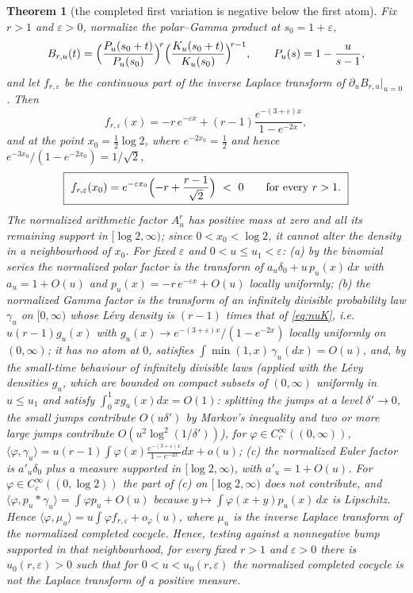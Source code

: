 \documentclass[11pt]{amsart}
\newtheorem{theorem}{Theorem}[section]
\theoremstyle{definition}
\theoremstyle{remark}
\theoremstyle{definition}
\newcommand{\eps}{\varepsilon}
\begin{document}
\begin{theorem}[the completed first variation is negative below the first atom]
\label{thm:halflog2}
Fix $r>1$ and $\eps>0$, normalize the polar--Gamma product at $s_0=1+\eps$,
\[
   B_{r,u}(t)=\Bigl(\frac{P_u(s_0+t)}{P_u(s_0)}\Bigr)^{\!r}
              \Bigl(\frac{K_u(s_0+t)}{K_u(s_0)}\Bigr)^{\!r-1},
   \qquad P_u(s)=1-\frac{u}{s-1},
\]
and let $f_{r,\eps}$ be the continuous part of the inverse Laplace transform of
$\partial_uB_{r,u}\big|_{u=0}$. Then
\begin{equation}\label{eq:frq}
   f_{r,\eps}(x)=-r\,e^{-\eps x}+(r-1)\frac{e^{-(3+\eps)x}}{1-e^{-2x}},
\end{equation}
and at the point $x_0=\tfrac12\log2$, where $e^{-2x_0}=\tfrac12$ and hence
$e^{-3x_0}/(1-e^{-2x_0})=1/\sqrt2$,
\begin{equation}\label{eq:frq-neg}
   \boxed{\ f_{r,\eps}(x_0)=e^{-\eps x_0}\Bigl(-r+\frac{r-1}{\sqrt2}\Bigr)\ <\ 0
   \qquad\text{for every }r>1.\ }
\end{equation}
The normalized arithmetic factor $A_u^r$ has positive mass at zero and all its remaining support in
$[\log2,\infty)$; since $0<x_0<\log2$, it cannot alter the density in a neighbourhood of $x_0$.
For fixed $\eps$ and $0<u\le u_1<\eps$: (a) by the binomial series the normalized polar factor is
the transform of $a_u\delta_0+u\,p_u(x)\,dx$ with $a_u=1+O(u)$ and $p_u(x)=-r\,e^{-\eps x}+O(u)$
locally uniformly; (b) the normalized Gamma factor is the transform of an infinitely divisible
probability law $\gamma_u$ on $[0,\infty)$ whose L\'evy density is $(r-1)$ times that of
\eqref{eq:nuK}, i.e.\ $u(r-1)g_u(x)$ with $g_u(x)\to e^{-(3+\eps)x}/(1-e^{-2x})$ locally
uniformly on $(0,\infty)$; it has no atom at $0$, satisfies $\int\min(1,x)\,\gamma_u(dx)=O(u)$,
and, by the small-time behaviour of infinitely divisible laws \cite{Sato} (applied with the L\'evy densities $g_u$, which are bounded on compact subsets of $(0,\infty)$ uniformly in $u\le u_1$ and satisfy $\int_0^1xg_u(x)dx=O(1)$: splitting the jumps at a level $\delta'\to0$, the small jumps contribute $O(u\delta')$ by Markov's inequality and two or more large jumps contribute $O(u^2\log^2(1/\delta'))$), for
$\varphi\in C_c^\infty((0,\infty))$,
$\langle\varphi,\gamma_u\rangle=u(r-1)\int\varphi(x)\frac{e^{-(3+\eps)x}}{1-e^{-2x}}dx+o(u)$;
(c) the normalized Euler factor is $a'_u\delta_0$ plus a measure supported in $[\log2,\infty)$,
with $a'_u=1+O(u)$. For $\varphi\in C_c^\infty((0,\log2))$ the part of (c) on $[\log2,\infty)$
does not contribute, and $\langle\varphi,p_u*\gamma_u\rangle=\int\varphi p_u+O(u)$ because
$y\mapsto\int\varphi(x+y)p_u(x)\,dx$ is Lipschitz. Hence
$\langle\varphi,\mu_u\rangle=u\int\varphi f_{r,\eps}+o_\varphi(u)$, where $\mu_u$ is the inverse
Laplace transform of the normalized completed cocycle.
Hence, testing against a nonnegative bump supported in that neighbourhood, for every fixed $r>1$
and $\eps>0$ there is $u_0(r,\eps)>0$ such that for $0<u<u_0(r,\eps)$ the normalized completed
cocycle is not the Laplace transform of a positive measure.
\end{theorem}
\end{document}
